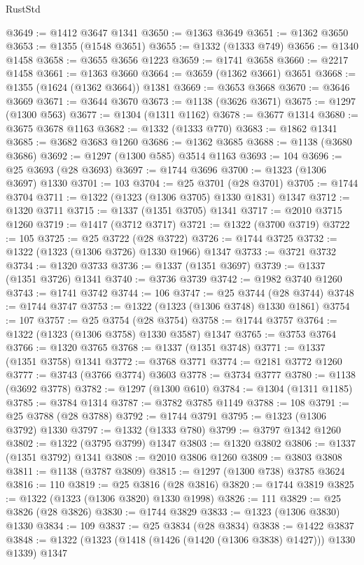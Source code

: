 \begin{lexlean}{RustStd}
\begin{coremodule}
@3649 := @1412 @3647 @1341
@3650 := @1363 @3649
@3651 := @1362 @3650
@3653 := @1355 (@1548 @3651)
@3655 := @1332 (@1333 @749)
@3656 := @1340 @1458
@3658 := @3655 @3656 @1223
@3659 := @1741 @3658
@3660 := @2217 @1458
@3661 := @1363 @3660
@3664 := @3659 (@1362 @3661) @3651
@3668 := @1355 (@1624 (@1362 @3664)) @1381
@3669 := @3653 @3668
@3670 := @3646 @3669
@3671 := @3644 @3670
@3673 := @1138 (@3626 @3671)
@3675 := @1297 (@1300 @563)
@3677 := @1304 (@1311 @1162)
@3678 := @3677 @1314
@3680 := @3675 @3678 @1163
@3682 := @1332 (@1333 @770)
@3683 := @1862 @1341
@3685 := @3682 @3683 @1260
@3686 := @1362 @3685
@3688 := @1138 (@3680 @3686)
@3692 := @1297 (@1300 @585) @3514 @1163
@3693 := 104
@3696 := @25 @3693 (@28 @3693)
@3697 := @1744 @3696
@3700 := @1323 (@1306 @3697) @1330
@3701 := 103
@3704 := @25 @3701 (@28 @3701)
@3705 := @1744 @3704
@3711 := @1322 (@1323 (@1306 @3705) @1330 @1831) @1347
@3712 := @1320 @3711
@3715 := @1337 (@1351 @3705) @1341
@3717 := @2010 @3715 @1260
@3719 := @1417 (@3712 @3717)
@3721 := @1322 (@3700 @3719)
@3722 := 105
@3725 := @25 @3722 (@28 @3722)
@3726 := @1744 @3725
@3732 := @1322 (@1323 (@1306 @3726) @1330 @1966) @1347
@3733 := @3721 @3732
@3734 := @1320 @3733
@3736 := @1337 (@1351 @3697)
@3739 := @1337 (@1351 @3726) @1341
@3740 := @3736 @3739
@3742 := @1982 @3740 @1260
@3743 := @1741 @3742
@3744 := 106
@3747 := @25 @3744 (@28 @3744)
@3748 := @1744 @3747
@3753 := @1322 (@1323 (@1306 @3748) @1330 @1861)
@3754 := 107
@3757 := @25 @3754 (@28 @3754)
@3758 := @1744 @3757
@3764 := @1322 (@1323 (@1306 @3758) @1330 @3587) @1347
@3765 := @3753 @3764
@3766 := @1320 @3765
@3768 := @1337 (@1351 @3748)
@3771 := @1337 (@1351 @3758) @1341
@3772 := @3768 @3771
@3774 := @2181 @3772 @1260
@3777 := @3743 (@3766 @3774) @3603
@3778 := @3734 @3777
@3780 := @1138 (@3692 @3778)
@3782 := @1297 (@1300 @610)
@3784 := @1304 (@1311 @1185)
@3785 := @3784 @1314
@3787 := @3782 @3785 @1149
@3788 := 108
@3791 := @25 @3788 (@28 @3788)
@3792 := @1744 @3791
@3795 := @1323 (@1306 @3792) @1330
@3797 := @1332 (@1333 @780)
@3799 := @3797 @1342 @1260
@3802 := @1322 (@3795 @3799) @1347
@3803 := @1320 @3802
@3806 := @1337 (@1351 @3792) @1341
@3808 := @2010 @3806 @1260
@3809 := @3803 @3808
@3811 := @1138 (@3787 @3809)
@3815 := @1297 (@1300 @738) @3785 @3624
@3816 := 110
@3819 := @25 @3816 (@28 @3816)
@3820 := @1744 @3819
@3825 := @1322 (@1323 (@1306 @3820) @1330 @1998)
@3826 := 111
@3829 := @25 @3826 (@28 @3826)
@3830 := @1744 @3829
@3833 := @1323 (@1306 @3830) @1330
@3834 := 109
@3837 := @25 @3834 (@28 @3834)
@3838 := @1422 @3837
@3848 := @1322 (@1323 (@1418 (@1426 (@1420 (@1306 @3838) @1427))) @1330 @1339) @1347

\end{coremodule}
\end{lexlean}
